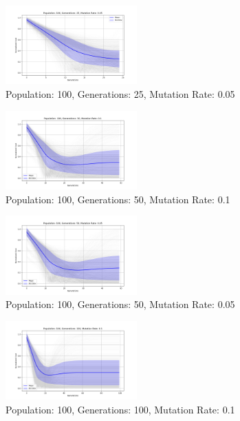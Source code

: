 \documentclass[
]{article}
\begin{document}
    \begin{figure}[H]
        \centering
        \includegraphics[width=0.45\textwidth]{genetic_algorithm/appendix/Population_100_Generations_25_MutationRate_0.05}
        \caption{Population: 100, Generations: 25, Mutation Rate: 0.05}
        \label{fig:app_ga_100_25_05}
    \end{figure}

    \begin{figure}[H]
        \centering
        \includegraphics[width=0.45\textwidth]{genetic_algorithm/appendix/Population_100_Generations_50_MutationRate_0.1}
        \caption{Population: 100, Generations: 50, Mutation Rate: 0.1}
        \label{fig:app_ga_100_50_1}
    \end{figure}

    \begin{figure}[H]
        \centering
        \includegraphics[width=0.45\textwidth]{genetic_algorithm/appendix/Population_100_Generations_50_MutationRate_0.05}
        \caption{Population: 100, Generations: 50, Mutation Rate: 0.05}
        \label{fig:app_ga_100_50_05}
    \end{figure}

    \begin{figure}[H]
        \centering
        \includegraphics[width=0.45\textwidth]{genetic_algorithm/appendix/Population_100_Generations_100_MutationRate_0.1}
        \caption{Population: 100, Generations: 100, Mutation Rate: 0.1}
        \label{fig:app_ga_100_100_1}
    \end{figure}
\end{document}
